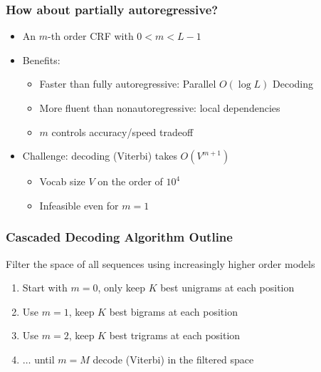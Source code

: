 \documentclass{beamer}
\begin{document}
\begin{frame}
\frametitle{How about partially autoregressive?}
\begin{itemize}
\item<+-> {An $m$-th order CRF with $0<m<L-1$}
\item<+-> {Benefits:
\begin{itemize}
    \item Faster than fully autoregressive: Parallel $O(\log L)$ Decoding {\tiny\citep{sarkka2019temporal,rush2020torch}}
    \item More fluent than nonautoregressive: local dependencies
    \item $m$ controls accuracy/speed tradeoff
\end{itemize}
}
\item<+-> Challenge: decoding (Viterbi) takes $O(V^{m+1})$
\begin{itemize}
    \item Vocab size $V$ on the order of $10^4$
    \item Infeasible even for $m=1$
\end{itemize}
\end{itemize}
\end{frame}

\begin{frame}
\frametitle{Cascaded Decoding Algorithm Outline}
Filter the space of all sequences using increasingly higher order models {\tiny\citep{weiss2010structured}}
\begin{enumerate}
\item<+-> Start with $m=0$, only keep $K$ best unigrams at each position
\item<+-> Use $m=1$, keep $K$ best bigrams at each position
\item<+-> Use $m=2$, keep $K$ best trigrams at each position
\item<+-> $\ldots$ until $m=M$ decode (Viterbi) in the filtered space
\end{enumerate}
\end{frame}
\end{document}
